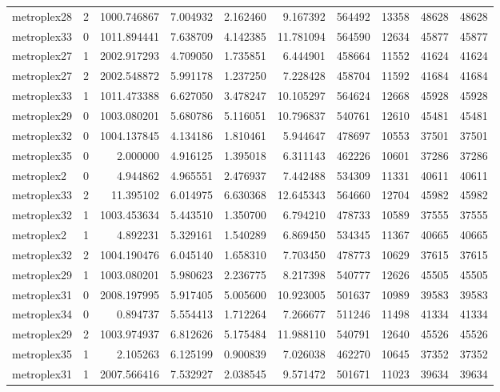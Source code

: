 \begin{longtable}{|l|r|r|r|r|r|r|r|r|r|}
metroplex28 & 2 & 1000.746867 & 7.004932 & 2.162460 & 9.167392 & 564492 & 13358 & 48628 & 48628 \\
metroplex33 & 0 & 1011.894441 & 7.638709 & 4.142385 & 11.781094 & 564590 & 12634 & 45877 & 45877 \\
metroplex27 & 1 & 2002.917293 & 4.709050 & 1.735851 & 6.444901 & 458664 & 11552 & 41624 & 41624 \\
metroplex27 & 2 & 2002.548872 & 5.991178 & 1.237250 & 7.228428 & 458704 & 11592 & 41684 & 41684 \\
metroplex33 & 1 & 1011.473388 & 6.627050 & 3.478247 & 10.105297 & 564624 & 12668 & 45928 & 45928 \\
metroplex29 & 0 & 1003.080201 & 5.680786 & 5.116051 & 10.796837 & 540761 & 12610 & 45481 & 45481 \\
metroplex32 & 0 & 1004.137845 & 4.134186 & 1.810461 & 5.944647 & 478697 & 10553 & 37501 & 37501 \\
metroplex35 & 0 & 2.000000 & 4.916125 & 1.395018 & 6.311143 & 462226 & 10601 & 37286 & 37286 \\
metroplex2 & 0 & 4.944862 & 4.965551 & 2.476937 & 7.442488 & 534309 & 11331 & 40611 & 40611 \\
metroplex33 & 2 & 11.395102 & 6.014975 & 6.630368 & 12.645343 & 564660 & 12704 & 45982 & 45982 \\
metroplex32 & 1 & 1003.453634 & 5.443510 & 1.350700 & 6.794210 & 478733 & 10589 & 37555 & 37555 \\
metroplex2 & 1 & 4.892231 & 5.329161 & 1.540289 & 6.869450 & 534345 & 11367 & 40665 & 40665 \\
metroplex32 & 2 & 1004.190476 & 6.045140 & 1.658310 & 7.703450 & 478773 & 10629 & 37615 & 37615 \\
metroplex29 & 1 & 1003.080201 & 5.980623 & 2.236775 & 8.217398 & 540777 & 12626 & 45505 & 45505 \\
metroplex31 & 0 & 2008.197995 & 5.917405 & 5.005600 & 10.923005 & 501637 & 10989 & 39583 & 39583 \\
metroplex34 & 0 & 0.894737 & 5.554413 & 1.712264 & 7.266677 & 511246 & 11498 & 41334 & 41334 \\
metroplex29 & 2 & 1003.974937 & 6.812626 & 5.175484 & 11.988110 & 540791 & 12640 & 45526 & 45526 \\
metroplex35 & 1 & 2.105263 & 6.125199 & 0.900839 & 7.026038 & 462270 & 10645 & 37352 & 37352 \\
metroplex31 & 1 & 2007.566416 & 7.532927 & 2.038545 & 9.571472 & 501671 & 11023 & 39634 & 39634 \\

\end{longtable}

